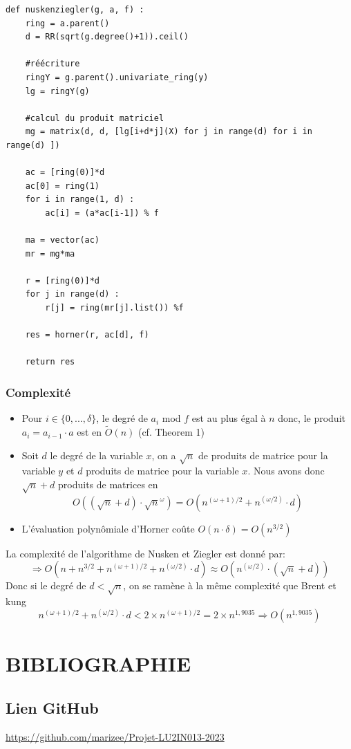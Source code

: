 \documentclass[a4paper]{article}
\begin{document}
\bigskip

\begin{lstlisting}[title={nusken et ziegler}]
def nuskenziegler(g, a, f) :
    ring = a.parent()
    d = RR(sqrt(g.degree()+1)).ceil()

    #réécriture
    ringY = g.parent().univariate_ring(y)
    lg = ringY(g)

    #calcul du produit matriciel
    mg = matrix(d, d, [lg[i+d*j](X) for j in range(d) for i in range(d) ])

    ac = [ring(0)]*d
    ac[0] = ring(1)
    for i in range(1, d) :
        ac[i] = (a*ac[i-1]) % f

    ma = vector(ac)
    mr = mg*ma

    r = [ring(0)]*d
    for j in range(d) :
        r[j] = ring(mr[j].list()) %f
    
    res = horner(r, ac[d], f)

    return res
\end{lstlisting}

\newpage
\subsubsection*{Complexité}
\begin{itemize}
    \item Pour $i \in \{0,...,\delta\}$, le degré de $a_i$ mod $f$ est au plus égal à $n$ donc, le produit $a_i=a_{i-1}\cdot a$ est en $\tilde{O}(n)$ (cf. Theorem 1)
    \item Soit $d$ le degré de la variable $x$, on a $\sqrt{n}$ de produits de matrice pour la variable $y$ et $d$ produits de matrice pour la variable $x$.
    Nous avons donc $\sqrt{n} + d$ produits de matrices en $$O((\sqrt{n}+d)\cdot \sqrt{n}^{\omega})=O(n^{(\omega+1)/2} + n^{(\omega/2)}\cdot d)$$ 
    \item L'évaluation polynômiale d'Horner coûte $O(n\cdot \delta)=O(n^{3/2})$
\end{itemize}
La complexité de l'algorithme de Nusken et Ziegler est donné par:
\[
\Longrightarrow O(n + n^{3/2} + n^{(\omega+1)/2} + n^{(\omega/2)}\cdot d) \approx O(n^{(\omega/2)}\cdot (\sqrt{n}+d))
\]
Donc si le degré de $d<\sqrt{n}$, on se ramène à la même complexité que Brent et kung
\[
n^{(\omega+1)/2} + n^{(\omega/2)}\cdot d < 2\times{n}^{(\omega+1)/2} = 2\times{n}^{1,9035} \Longrightarrow O(n^{1,9035})
\]

\newpage
\section{BIBLIOGRAPHIE}

\nocite{*}




\subsection*{Lien GitHub} 
\url{https://github.com/marizee/Projet-LU2IN013-2023}
\end{document}

